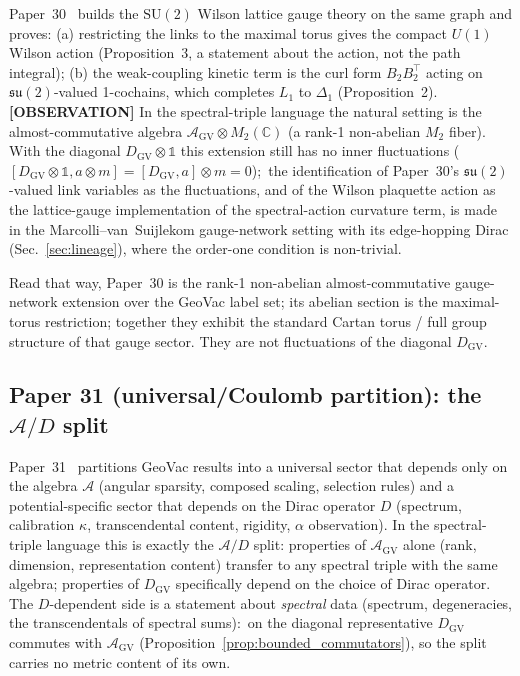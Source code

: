 \documentclass[11pt]{article}
\begin{document}
Paper~30~\cite{paper30} builds the $\mathrm{SU}(2)$ Wilson lattice
gauge theory on the same graph and proves: (a) restricting the links to
the maximal torus gives the compact $U(1)$ Wilson action (Proposition~3,
a statement about the action, not the path integral); (b) the
weak-coupling kinetic term is the curl form $B_2B_2^{\top}$ acting on
$\mathfrak{su}(2)$-valued 1-cochains, which completes $L_1$ to
$\Delta_1$ (Proposition~2).  \textbf{[OBSERVATION]} In the
spectral-triple language the natural setting is the
almost-commutative algebra $\mathcal{A}_{\mathrm{GV}} \otimes
M_2(\mathbb{C})$ (a rank-1 non-abelian $M_2$ fiber).  With the
diagonal $D_{\mathrm{GV}} \otimes \mathbb{1}$ this extension still has
no inner fluctuations ($[D_{\mathrm{GV}} \otimes \mathbb{1}, a \otimes
m] = [D_{\mathrm{GV}}, a] \otimes m = 0$);\ the identification of
Paper~30's $\mathfrak{su}(2)$-valued link variables as the
fluctuations, and of the Wilson plaquette action as the lattice-gauge
implementation of the spectral-action curvature term, is made in the
Marcolli--van~Suijlekom gauge-network setting with its edge-hopping
Dirac (Sec.~\ref{sec:lineage}), where the order-one condition is
non-trivial.

Read that way, Paper~30 is the rank-1 non-abelian almost-commutative
gauge-network extension over the GeoVac label set; its abelian
section is the maximal-torus restriction; together they exhibit the standard
Cartan torus / full group structure of that gauge sector.  They are
not fluctuations of the diagonal $D_{\mathrm{GV}}$.

\subsection{Paper 31 (universal/Coulomb partition): the
$\mathcal{A}/D$ split}

Paper~31~\cite{paper31} partitions GeoVac results into a universal
sector that depends only on the algebra $\mathcal{A}$ (angular
sparsity, composed scaling, selection rules) and a potential-specific
sector that depends on the Dirac operator $D$ (spectrum, calibration
$\kappa$, transcendental content, rigidity, $\alpha$ observation).  In
the spectral-triple language this is exactly the $\mathcal{A}/D$ split:
properties of $\mathcal{A}_{\mathrm{GV}}$ alone (rank, dimension,
representation content) transfer to any spectral triple with the same
algebra; properties of $D_{\mathrm{GV}}$ specifically depend on the
choice of Dirac operator.  The $D$-dependent side is a statement about
\emph{spectral} data (spectrum, degeneracies, the transcendentals of
spectral sums):\ on the diagonal representative $D_{\mathrm{GV}}$
commutes with $\mathcal{A}_{\mathrm{GV}}$
(Proposition~\ref{prop:bounded_commutators}), so the split carries no
metric content of its own.
\end{document}
